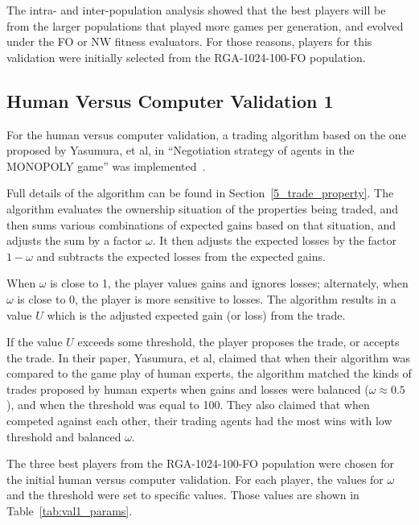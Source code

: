 The intra- and inter-population analysis showed that the best players will be
from the larger populations that played more games per generation, and evolved
under the FO or NW fitness evaluators. For those reasons, players for this
validation were initially selected from the RGA-1024-100-FO population.

\subsection{Human Versus Computer Validation 1}\label{6_humanVRGA1}

For the human versus computer validation, a trading algorithm based on the one
proposed by Yasumura, et al, in ``Negotiation strategy of agents in the MONOPOLY
game'' was implemented~\cite{Yasumura2001Negotiate}.

Full details of the algorithm can be found in Section~\ref{5_trade_property}.
The algorithm evaluates the ownership situation of the properties being traded,
and then sums various combinations of expected gains based on that situation,
and adjusts the sum by a factor \(\omega\). It then adjusts the expected losses
by the factor \(1-\omega\) and subtracts the expected losses from the expected
gains.

When \(\omega\) is close to 1, the player values gains and ignores losses;
alternately, when \(\omega\) is close to 0, the player is more sensitive to
losses. The algorithm results in a value \(U\) which is the adjusted expected
gain (or loss) from the trade.

If the value \(U\) exceeds some threshold, the player proposes the trade, or
accepts the trade. In their paper, Yasumura, et al, claimed that when their
algorithm was compared to the game play of human experts, the algorithm matched
the kinds of trades proposed by human experts when gains and losses were
balanced (\(\omega \approx 0.5\)), and when the threshold was equal to 100. They
also claimed that when competed against each other, their trading agents had the
most wins with low threshold and balanced \(\omega\).

The three best players from the RGA-1024-100-FO population were chosen for the
initial human versus computer validation. For each player, the values for
\(\omega\) and the threshold were set to specific values. Those values are shown
in Table~\ref{tab:val1_params}.

